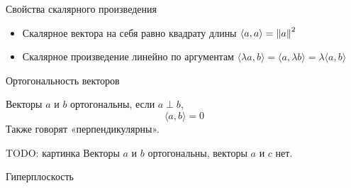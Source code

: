 \documentclass[14pt,xcolor=dvipsnames]{beamer}
\begin{document}
\begin{frame}{Свойства скалярного произведения}

  \begin{itemize}[<+->]
  \item Скалярное вектора на себя равно квадрату длины
  $\langle a, a \rangle = \norm{a}^2$
  
  \item Скалярное произведение линейно по аргументам
  $\langle \lambda a, b \rangle = \langle a,  \lambda  b \rangle = \lambda  \langle a,  b \rangle$
  \end{itemize}
  
  \end{frame}
  




  






\begin{frame}{Ортогональность векторов}
  
\begin{block}{Векторы $a$ и $b$ ортогональны, если $a\perp b$,}
\[
  \langle a, b \rangle =0
\]
Также говорят «перпендикулярны».
\end{block}
  
\begin{block}{TODO: картинка}
Векторы $a$ и $b$ ортогональны, векторы $a$ и $c$ нет.
\end{block}

\end{frame}
  




\begin{frame}
  Гиперплоскость 
\end{frame}
\end{document}
